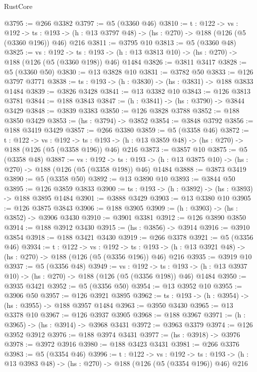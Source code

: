 \begin{lexlean}{RustCore}
\begin{coremodule}
@3795 := @266 @3382
@3797 := @5 (@3360 @46)
@3810 := {t : @122} ->
  {vs : @192} ->
  {ts : @193} -> (h : @13 @3797 @48) -> (hs : @270) -> @188 (@126 (@5 (@3360 @196)) @46) @216
@3811 := @3795 @10
@3813 := @5 (@3360 @48)
@3825 := {vs : @192} ->
  {ts : @193} -> (h : @13 @3813 @10) -> (hs : @270) -> @188 (@126 (@5 (@3360 @198)) @46) @1484
@3826 := @3811 @3417
@3828 := @5 (@3360 @50)
@3830 := @13 @3828 @10
@3831 := @3782 @50
@3833 := @126 @3797 @3771
@3838 := {ts : @193} -> (h : @3830) -> (hs : @3831) -> @188 @3833 @1484
@3839 := @3826 @3428
@3841 := @13 @3382 @10
@3843 := @126 @3813 @3781
@3844 := @188 @3843
@3847 := (h : @3841) -> (hs : @3790) -> @3844 @3429
@3848 := @3839 @3383
@3850 := @126 @3828 @3788
@3852 := @188 @3850 @3429
@3853 := (hs : @3794) -> @3852
@3854 := @3848 @3792
@3856 := @188 @3419 @3429
@3857 := @266 @3380
@3859 := @5 (@3358 @46)
@3872 := {t : @122} ->
  {vs : @192} ->
  {ts : @193} -> (h : @13 @3859 @48) -> (hs : @270) -> @188 (@126 (@5 (@3358 @196)) @46) @216
@3873 := @3857 @10
@3875 := @5 (@3358 @48)
@3887 := {vs : @192} ->
  {ts : @193} -> (h : @13 @3875 @10) -> (hs : @270) -> @188 (@126 (@5 (@3358 @198)) @46) @1484
@3888 := @3873 @3419
@3890 := @5 (@3358 @50)
@3892 := @13 @3890 @10
@3893 := @3844 @50
@3895 := @126 @3859 @3833
@3900 := {ts : @193} -> (h : @3892) -> (hs : @3893) -> @188 @3895 @1484
@3901 := @3888 @3429
@3903 := @13 @3380 @10
@3905 := @126 @3875 @3843
@3906 := @188 @3905
@3909 := (h : @3903) -> (hs : @3852) -> @3906 @3430
@3910 := @3901 @3381
@3912 := @126 @3890 @3850
@3914 := @188 @3912 @3430
@3915 := (hs : @3856) -> @3914
@3916 := @3910 @3854
@3918 := @188 @3421 @3430
@3919 := @266 @3378
@3921 := @5 (@3356 @46)
@3934 := {t : @122} ->
  {vs : @192} ->
  {ts : @193} -> (h : @13 @3921 @48) -> (hs : @270) -> @188 (@126 (@5 (@3356 @196)) @46) @216
@3935 := @3919 @10
@3937 := @5 (@3356 @48)
@3949 := {vs : @192} ->
  {ts : @193} -> (h : @13 @3937 @10) -> (hs : @270) -> @188 (@126 (@5 (@3356 @198)) @46) @1484
@3950 := @3935 @3421
@3952 := @5 (@3356 @50)
@3954 := @13 @3952 @10
@3955 := @3906 @50
@3957 := @126 @3921 @3895
@3962 := {ts : @193} -> (h : @3954) -> (hs : @3955) -> @188 @3957 @1484
@3963 := @3950 @3430
@3965 := @13 @3378 @10
@3967 := @126 @3937 @3905
@3968 := @188 @3967
@3971 := (h : @3965) -> (hs : @3914) -> @3968 @3431
@3972 := @3963 @3379
@3974 := @126 @3952 @3912
@3976 := @188 @3974 @3431
@3977 := (hs : @3918) -> @3976
@3978 := @3972 @3916
@3980 := @188 @3423 @3431
@3981 := @266 @3376
@3983 := @5 (@3354 @46)
@3996 := {t : @122} ->
  {vs : @192} ->
  {ts : @193} -> (h : @13 @3983 @48) -> (hs : @270) -> @188 (@126 (@5 (@3354 @196)) @46) @216

\end{coremodule}
\end{lexlean}
